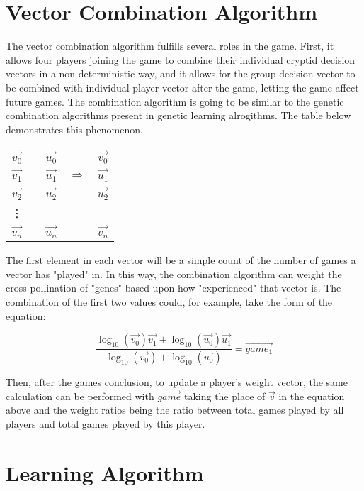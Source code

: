 \section{Vector Combination Algorithm}

The vector combination algorithm fulfills several roles in the game. First, it allows four players joining the game to combine their individual cryptid decision vectors in a non-deterministic way, and it allows for the group decision vector to be combined with individual player vector after the game, letting the game affect future games. The combination algorithm is going to be similar to the genetic combination algorithms present in genetic learning alrogithms. The table below demonstrates this phenomenon.

\begin{tabular}{ccccc}
$\vec{v_0}$ & & $\vec{u_0}$ & & $\vec{v_0}$ \\
$\vec{v_1}$ & & $\vec{u_1}$ & $\Longrightarrow$ & $\vec{u_1}$ \\
$\vec{v_2}$ & & $\vec{u_2}$ & & $\vec{u_2}$ \\
\vdots & & & & \\
$\vec{v_n}$ & & $\vec{u_n}$ & & $\vec{v_n}$ \\
\end{tabular}

The first element in each vector will be a simple count of the number of games a vector has "played" in. In this way, the combination algorithm can weight the cross pollination of "genes" based upon how "experienced" that vector is. The combination of the first two values could, for example, take the form of the equation:

\begin{equation}
    \frac{{\log_{10}(\vec{v_0})}\vec{v_1} + {\log_{10}(\vec{u_0})}\vec{u_1}}{\log_{10}(\vec{v_0}) + \log_{10}(\vec{u_0})} = \vec{game_1}
\end{equation}

Then, after the games conclusion, to update a player's weight vector, the same calculation can be performed with $\vec{game}$ taking the place of $\vec{v}$ in the equation above and the weight ratios being the ratio between total games played by all players and total games played by this player. 

\section{Learning Algorithm}

